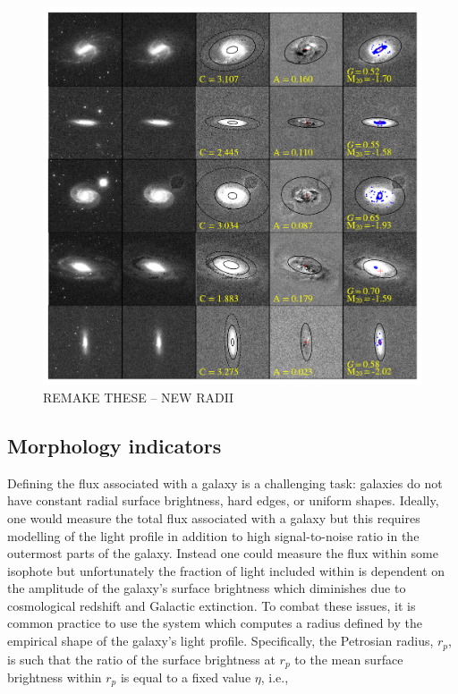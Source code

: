 \begin{figure}
\includegraphics[width=\textwidth]{Figures/measure_morph_hardest.pdf}
\caption[Examples of image cleaning and morphology diagnostic measurements]{REMAKE THESE -- NEW RADII}
\label{fig: clean examples}
\end{figure}


\subsection{Morphology indicators}
Defining the flux associated with a galaxy is a challenging task: galaxies do not have constant radial surface brightness, hard edges, or uniform shapes. Ideally, one would measure the total flux associated with a galaxy but this requires modelling of the light profile in addition to high signal-to-noise ratio in the outermost parts of the galaxy. Instead one could measure the flux within some isophote but unfortunately the fraction of light included within is dependent on the amplitude of the galaxy's surface brightness which diminishes due to cosmological redshift and Galactic extinction. To combat these issues, it is common practice to use the \cite{Petrosian1976} system  which computes a radius defined by the empirical shape of the galaxy's light profile. Specifically, the Petrosian radius, $r_p$, is such that the ratio of the surface brightness at $r_p$ to the mean surface brightness within $r_p$ is equal to a fixed value $\eta$, i.e., 

